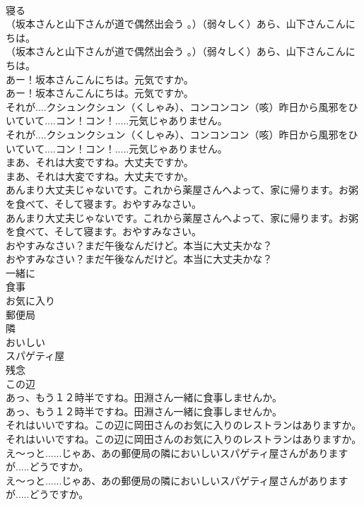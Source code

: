 \documentclass[8pt]{extreport}
\begin{document}
\begin{CJK}{UTF8}{min}
\\	寝る
\\	（坂本さんと山下さんが道で偶然出会う 。）（弱々しく）あら、山下さんこんにちは。	
\\	（坂本さんと山下さんが道で偶然出会う 。）（弱々しく）あら、山下さんこんにちは。 
\\	あー！坂本さんこんにちは。元気ですか。	
\\	あー！坂本さんこんにちは。元気ですか。 
\\	それが....クシュンクシュン（くしゃみ）、コンコンコン（咳）昨日から風邪をひいていて....コン！コン！.....元気じゃありません。	
\\	それが....クシュンクシュン（くしゃみ）、コンコンコン（咳）昨日から風邪をひいていて....コン！コン！.....元気じゃありません。 
\\	まあ、それは大変ですね。大丈夫ですか。	
\\	まあ、それは大変ですね。大丈夫ですか。 
\\	あんまり大丈夫じゃないです。これから薬屋さんへよって、家に帰ります。お粥を食べて、そして寝ます。おやすみなさい。	
\\	あんまり大丈夫じゃないです。これから薬屋さんへよって、家に帰ります。お粥を食べて、そして寝ます。おやすみなさい。 
\\	おやすみなさい？まだ午後なんだけど。本当に大丈夫かな？	
\\	おやすみなさい？まだ午後なんだけど。本当に大丈夫かな？ 
\\	一緒に
\\	食事
\\	お気に入り
\\	郵便局
\\	隣
\\	おいしい
\\	スパゲティ屋
\\	残念
\\	この辺
\\	あっ、もう１２時半ですね。田淵さん一緒に食事しませんか。	
\\	あっ、もう１２時半ですね。田淵さん一緒に食事しませんか。 
\\	それはいいですね。この辺に岡田さんのお気に入りのレストランはありますか。	
\\	それはいいですね。この辺に岡田さんのお気に入りのレストランはありますか。 
\\	え〜っと......じゃあ、あの郵便局の隣においしいスパゲティ屋さんがありますが.....どうですか。	
\\	え〜っと......じゃあ、あの郵便局の隣においしいスパゲティ屋さんがありますが.....どうですか。 

\end{CJK}
\end{document}
